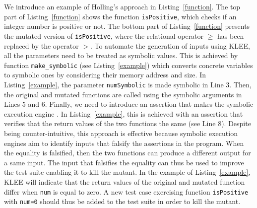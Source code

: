 We introduce an example of Holling's approach in Listing~\ref{function}. The top part of Listing~\ref{function} shows the function \texttt{isPositive}, which checks if an integer number is positive or not. The bottom part of Listing~\ref{function} presents the mutated version of \texttt{isPositive}, where the relational operator $\geq$ has been replaced by the operator $>$.
To automate the generation of inputs using KLEE, all the parameters need to be treated as symbolic values.
This is achieved by function \texttt{make\_symbolic} (see Listing~\ref{example}) which converts concrete variables to symbolic ones by considering their memory address and size. 
In Listing~\ref{example}, the parameter \texttt{numSymbolic} is made symbolic in Line 3. Then, the original and mutated functions are called using the symbolic arguments in Lines 5 and 6.
Finally, we need to introduce an assertion that makes the symbolic execution engine . 
In Listing~\ref{example}, this is achieved with an assertion that verifies that the return values of the two functions the same (see Line 8). 
Despite being counter-intuitive, this approach is effective because symbolic execution engines aim to identify inputs that falsify the assertions in the program. 
When the equality is falsified, then the two functions can produce a different output for a same input.
The input that falsifies the equality can thus be used to improve the test suite enabling it to kill the mutant.
In the example of Listing~\ref{example}, KLEE will indicate that the return values of the original and mutated function differ when \texttt{num} is equal to zero.
A new test case exercising function \texttt{isPositive} with \texttt{num=0} should thus be added to the test suite in order to kill the mutant.



